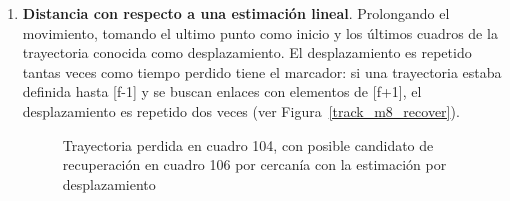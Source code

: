 \begin{itemize}
\begin{enumerate}
  \item \textbf{Distancia con respecto a una estimación lineal}. Prolongando el movimiento, tomando el ultimo punto como inicio y los últimos cuadros de la trayectoria conocida como desplazamiento. El desplazamiento es repetido tantas veces como tiempo perdido tiene el marcador: si una trayectoria estaba definida hasta [f-1] y se buscan enlaces con elementos de [f+1], el desplazamiento es repetido dos veces (ver Figura~\ref{track_m8_recover}). 
 
\begin{figure}[ht!]
 \centering
  \hspace{3 mm}
	
\caption{Trayectoria perdida en cuadro 104, con posible candidato de recuperación en cuadro 106 por cercanía con la estimación por desplazamiento}
\label{inventario_trayectoria_direccional}
\end{figure} 
  

\end{enumerate}
\end{itemize}
